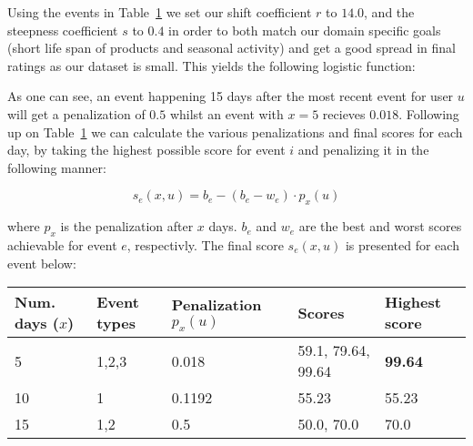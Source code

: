 Using the events in Table~\ref{events-example} we set our shift coefficient $r$
to $14.0$, and the steepness coefficient $s$ to $0.4$ in order to both match
our domain specific goals (short life span of products and seasonal activity)
and get a good spread in final ratings as our dataset is small. This yields the
following logistic function:

\begin{figure}[h!]
  \centering
\end{figure}

As one can see, an event happening 15 days after the most recent event for user
$u$ will get a penalization of $0.5$ whilst an event with $x=5$ recieves
$0.018$. Following up on Table~\ref{events-example} we can calculate the
various penalizations and final scores for each day, by taking the highest
possible score for event $i$ and penalizing it in the following manner:

\begin{equation}
  s_{e}(x,u) = b_e - (b_e - w_e) \cdot p_{x}(u)
\end{equation}

where $p_x$ is the penalization after $x$ days. $b_e$ and $w_e$ are the best
and worst scores achievable for event $e$, respectivly. The final score
$s_{e}(x,u)$ is presented for each event below:

\begin{table}[H]
  \centering
  \label{events-example}
  \begin{tabular}{llm{2cm}ll}
    \toprule
    Num. days ($x$) & Event types & Penalization $p_{x}(u)$ & Scores & Highest score \\
    \midrule
    5   & 1,2,3 & 0.018   & 59.1, 79.64, 99.64 & \textbf{99.64} \\
    10  & 1     & 0.1192  & 55.23              & 55.23  \\
    15  & 1,2   & 0.5     & 50.0, 70.0         & 70.0 \\
    \bottomrule
  \end{tabular}
\end{table}

